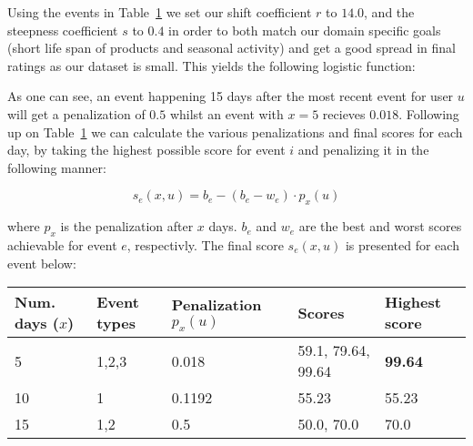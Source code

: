 Using the events in Table~\ref{events-example} we set our shift coefficient $r$
to $14.0$, and the steepness coefficient $s$ to $0.4$ in order to both match
our domain specific goals (short life span of products and seasonal activity)
and get a good spread in final ratings as our dataset is small. This yields the
following logistic function:

\begin{figure}[h!]
  \centering
\end{figure}

As one can see, an event happening 15 days after the most recent event for user
$u$ will get a penalization of $0.5$ whilst an event with $x=5$ recieves
$0.018$. Following up on Table~\ref{events-example} we can calculate the
various penalizations and final scores for each day, by taking the highest
possible score for event $i$ and penalizing it in the following manner:

\begin{equation}
  s_{e}(x,u) = b_e - (b_e - w_e) \cdot p_{x}(u)
\end{equation}

where $p_x$ is the penalization after $x$ days. $b_e$ and $w_e$ are the best
and worst scores achievable for event $e$, respectivly. The final score
$s_{e}(x,u)$ is presented for each event below:

\begin{table}[H]
  \centering
  \label{events-example}
  \begin{tabular}{llm{2cm}ll}
    \toprule
    Num. days ($x$) & Event types & Penalization $p_{x}(u)$ & Scores & Highest score \\
    \midrule
    5   & 1,2,3 & 0.018   & 59.1, 79.64, 99.64 & \textbf{99.64} \\
    10  & 1     & 0.1192  & 55.23              & 55.23  \\
    15  & 1,2   & 0.5     & 50.0, 70.0         & 70.0 \\
    \bottomrule
  \end{tabular}
\end{table}

